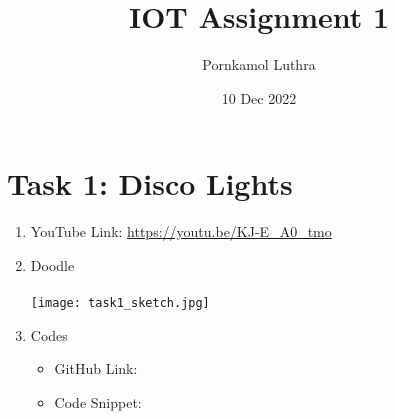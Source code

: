 \documentclass[12pt]{article}
\title{IOT Assignment 1}
\author{Pornkamol Luthra}
\date{10 Dec 2022}
\begin{document}
\maketitle

\section{Task 1: Disco Lights}

\begin{enumerate}
    \item YouTube Link: \href{https://youtu.be/KJ-E_A0_tmo}{https://youtu.be/KJ-E\_A0\_tmo}
    \item Doodle \\\\
        \texttt{[image: task1\_sketch.jpg]}
    \item Codes
        \begin{itemize}
            \item GitHub Link: 
            \item Code Snippet:
        \end{itemize}
\end{enumerate}
\end{document}
